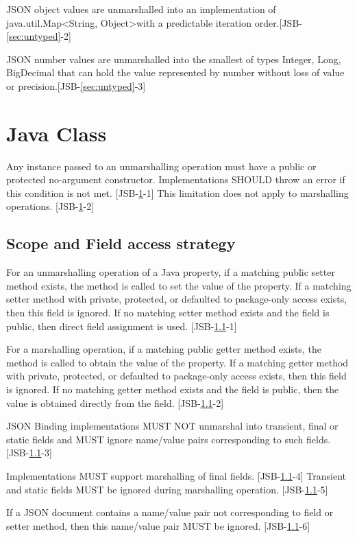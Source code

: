JSON object values are unmarshalled into an implementation of java.util.Map\textless String, Object\textgreater\space with a predictable iteration order.[JSB-\ref{sec:untyped}-2]

JSON number values are unmarshalled into the smallest of types Integer, Long, BigDecimal that can hold the value represented by number without loss of value or precision.[JSB-\ref{sec:untyped}-3]

\section{Java Class}
\label{sec:class}
Any instance passed to an unmarshalling operation must have a public or protected no-argument constructor. Implementations SHOULD throw an error if this condition is not met. [JSB-\ref{sec:class}-1] This limitation does not apply to marshalling operations. [JSB-\ref{sec:class}-2]

\subsection{Scope and Field access strategy}
\label{subsec:fieldstrategy}
For an unmarshalling operation of a Java property, if a matching public setter method exists, the method is called to set the value of the property. 
If a matching setter method with private, protected, or defaulted to package-only access exists, then this field is ignored. 
If no matching setter method exists and the field is public, then direct field assignment is used. [JSB-\ref{subsec:fieldstrategy}-1]

For a marshalling operation, if a matching public getter method exists, the method is called to obtain the value of the property. 
If a matching getter method with private, protected, or defaulted to package-only access exists, then this field is ignored. 
If no matching getter method exists and the field is public, then the value is obtained directly from the field. [JSB-\ref{subsec:fieldstrategy}-2]

JSON Binding implementations MUST NOT unmarshal into transient, final or static fields and MUST ignore name/value pairs corresponding to such fields. [JSB-\ref{subsec:fieldstrategy}-3]

Implementations MUST support marshalling of final fields. [JSB-\ref{subsec:fieldstrategy}-4] Transient and static fields MUST be ignored during marshalling operation. [JSB-\ref{subsec:fieldstrategy}-5]

If a JSON document contains a name/value pair not corresponding to field or setter method, then this name/value pair MUST be ignored. [JSB-\ref{subsec:fieldstrategy}-6]

